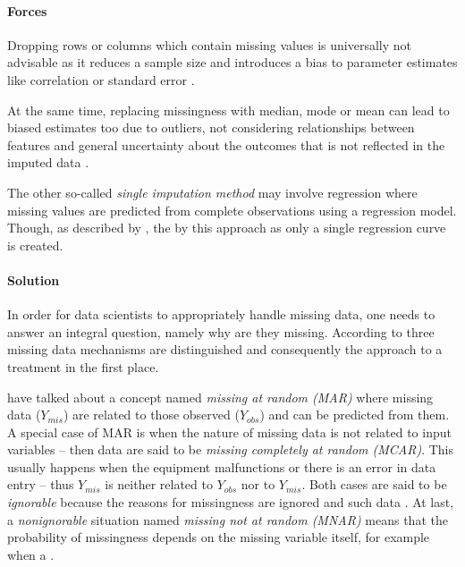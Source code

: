 \paragraph*{Forces}
\begin{compactitem}
  \item Dropping rows or columns which contain missing values is universally not advisable as it reduces a sample size and introduces a bias to parameter estimates like correlation or standard error \parencite{Gelman2007}. 
  \item At the same time, replacing missingness with median, mode or mean can lead to biased estimates too due to outliers, not considering relationships between features and general uncertainty about the outcomes that is not reflected in the imputed data \parencite{Rubin2002}.
  \item The other so-called \emph{single imputation method} may involve regression where missing values are predicted from complete observations using a regression model. 
  Though, as described by \textcites[6]{ZhangSingleImput2016}{GarcijaGomez2010}, the  by this approach as only a single regression curve is created. 
\end{compactitem}

\paragraph*{Solution}
In order for data scientists to appropriately handle missing data, one needs to answer an integral question, namely why are they missing.  
According to \textcite[3]{DabneyAlanNormalization2012} three missing data mechanisms are distinguished and consequently the approach to a treatment  in the first place. 

\textcite{Rubin2002} have talked about a concept named \emph{missing at random (MAR)} where missing data ($Y_{mis}$) are related to those observed ($Y_{obs}$) and can be predicted from them.
A special case of MAR is when the nature of missing data is not related to input variables -- then data are said to be \emph{missing completely at random (MCAR)}.
This usually happens when the equipment malfunctions or there is an error in data entry -- thus $Y_{mis}$ is neither related to $Y_{obs}$ nor to $Y_{mis}$. 
Both cases are said to be \emph{ignorable} because the reasons for missingness are ignored and  such data \parencites[340]{Lynn2002}.
At last, a \emph{nonignorable} situation named \emph{missing not at random (MNAR)} means that the probability of missingness depends on the missing variable itself, for example when a  \parencites[266]{GarcijaGomez2010}{Grahama2002}{Gelman2007}.

